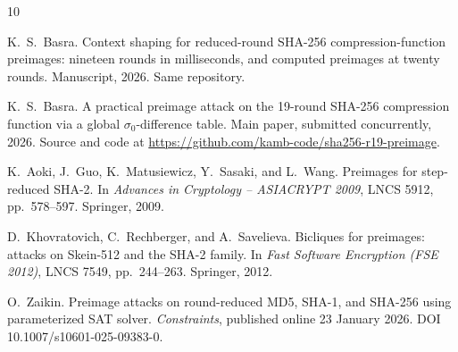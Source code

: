 \documentclass[11pt,a4paper]{article}
\begin{document}
\begin{thebibliography}{10}

K.~S.~Basra.
\newblock Context shaping for reduced-round {SHA-256} compression-function
  preimages: nineteen rounds in milliseconds, and computed preimages at
  twenty rounds.
\newblock Manuscript, 2026.  Same repository.

K.~S.~Basra.
\newblock A practical preimage attack on the 19-round {SHA-256} compression
  function via a global $\sigma_0$-difference table.
\newblock Main paper, submitted concurrently, 2026.  Source and code at
  \url{https://github.com/kamb-code/sha256-r19-preimage}.

K.~Aoki, J.~Guo, K.~Matusiewicz, Y.~Sasaki, and L.~Wang.
\newblock Preimages for step-reduced {SHA-2}.
\newblock In \emph{Advances in Cryptology -- ASIACRYPT 2009}, LNCS 5912,
  pp.~578--597. Springer, 2009.

D.~Khovratovich, C.~Rechberger, and A.~Savelieva.
\newblock Bicliques for preimages: attacks on {Skein-512} and the {SHA-2}
  family.
\newblock In \emph{Fast Software Encryption (FSE 2012)}, LNCS 7549,
  pp.~244--263. Springer, 2012.

O.~Zaikin.
\newblock Preimage attacks on round-reduced {MD5}, {SHA-1}, and {SHA-256}
  using parameterized {SAT} solver.
\newblock \emph{Constraints}, published online 23 January 2026.
  DOI 10.1007/s10601-025-09383-0.

\end{thebibliography}
\end{document}
